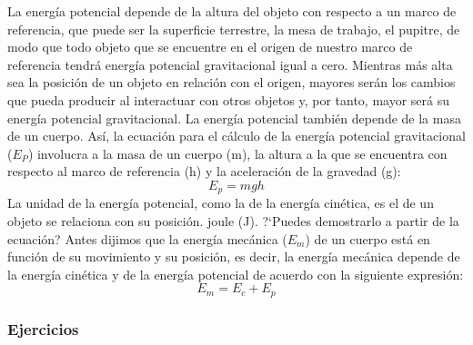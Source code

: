 \documentclass[11pt]{book}
\newenvironment{questions}[1][]{\enumerate[,#1]}{\endenumerate}
\begin{document}
La energ\'ia potencial depende de la altura del objeto con respecto a un marco de
referencia, que puede ser la superficie terrestre, la mesa de trabajo, el
pupitre,
de modo que todo objeto que se encuentre en el origen de nuestro marco de
referencia tendr\'a energ\'ia potencial gravitacional igual a cero. Mientras m\'as
alta sea la posici\'on de un objeto en relaci\'on con el origen, mayores ser\'an los
cambios que pueda
producir al interactuar con otros objetos y, por tanto, mayor ser\'a su energ\'ia
potencial
gravitacional.
La energ\'ia potencial tambi\'en depende de la masa de un cuerpo. As\'i, la
ecuaci\'on para el c\'alculo de la energ\'ia potencial gravitacional ($E_P$) involucra
a la masa de un cuerpo (m), la altura a la que se encuentra con respecto al
marco de referencia (h) y la aceleraci\'on de la gravedad (g):
\begin{equation*}
  E_p=mgh
\end{equation*}
La unidad de la energ\'ia potencial, como la de la energ\'ia cin\'etica, es el de un
objeto se relaciona con
su posici\'on.
joule (J). ?`Puedes demostrarlo a partir de la ecuaci\'on?
Antes dijimos que la energ\'ia mec\'anica ($E_m$) de un cuerpo est\'a en funci\'on de su
movimiento y su posici\'on, es decir, la energ\'ia mec\'anica depende de la energ\'ia
cin\'etica y de la energ\'ia potencial de acuerdo con la siguiente expresi\'on:
\begin{equation*}
  E_m=E_c+E_p
\end{equation*}

\subsubsection{Ejercicios}
\end{document}
